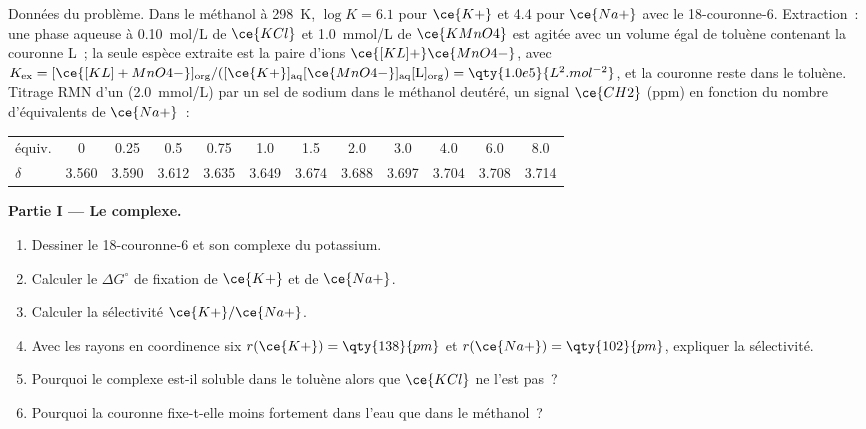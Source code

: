 \begin{problem}
\label{pb:b3:supramolecular:1}
Données du problème. Dans le méthanol à \qty{298}{K}, $\log K = 6.1$ pour $\ce{K+}$ et 4.4 pour $\ce{Na+}$ avec le
18-couronne-6. Extraction~: une phase aqueuse à \qty{0.10}{mol/L} de $\ce{KCl}$ et \qty{1.0}{mmol/L} de $\ce{KMnO4}$ est agitée
avec un volume égal de toluène contenant la couronne L~; la seule espèce
extraite est la paire d'ions $\ce{[KL]+}\ce{MnO4-}$, avec
$K_{\mathrm{ex}} = [\ce{[KL]+MnO4-}]_{\mathrm{org}}/([\ce{K+}]_{\mathrm{aq}}[\ce{MnO4-}]_{\mathrm{aq}}[\mathrm L]_{\mathrm{org}}) = \qty{1.0e5}{L^2.mol^{-2}}$, et la couronne reste dans le toluène. Titrage RMN d'un
 (\qty{2.0}{mmol/L}) par un sel de sodium dans le méthanol deutéré, un signal $\ce{CH2}$
(ppm) en fonction du nombre d'équivalents de $\ce{Na+}$~:

\begin{center}\small
\begin{tabular}{l*{11}{c}}
\hline
équiv. & 0 & 0.25 & 0.5 & 0.75 & 1.0 & 1.5 & 2.0 & 3.0 & 4.0 & 6.0 & 8.0\\
$\delta$ & 3.560 & 3.590 & 3.612 & 3.635 & 3.649 & 3.674 & 3.688 & 3.697 & 3.704 & 3.708 & 3.714\\
\hline
\end{tabular}
\end{center}

\medskip\noindent\textbf{Partie I --- Le complexe.}
\begin{enumerate}
  \item Dessiner le 18-couronne-6 et son complexe du potassium.
  \item Calculer le $\Delta G^\circ$ de fixation de $\ce{K+}$ et de $\ce{Na+}$.
  \item Calculer la sélectivité $\ce{K+}/\ce{Na+}$.
  \item Avec les rayons en coordinence six $r(\ce{K+}) = \qty{138}{pm}$ et $r(\ce{Na+}) = \qty{102}{pm}$, expliquer la sélectivité.
  \item Pourquoi le complexe est-il soluble dans le toluène alors que $\ce{KCl}$ ne l'est pas~?
  \item Pourquoi la couronne fixe-t-elle moins fortement dans l'eau que
        dans le méthanol~?
\end{enumerate}


\end{problem}
